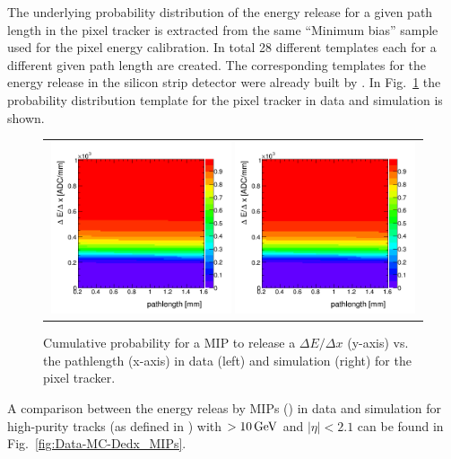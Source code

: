 The underlying probability distribution of the energy release for a given path length in the pixel tracker is extracted from the same ``Minimum bias'' sample used for the pixel energy calibration.
In total 28 different templates each for a different given path length are created.
The corresponding templates for the energy release in the silicon strip detector were already built by  \cite{bib:Quertenmont_2010}.
In Fig.~\ref{fig:ProbabilityTemplate} the probability distribution template for the pixel tracker in data and simulation is shown.
\begin{figure}[!tb]
  \centering 
  \begin{tabular}{c}
    \includegraphics[width=0.49\textwidth]{figures/analysis/Discriminator_template_data_pixel_2012.png}
    \includegraphics[width=0.49\textwidth]{figures/analysis/Discriminator_template_mc_pixel_2012.png}
  \end{tabular}
  \caption{Cumulative probability for a MIP to release a $\Delta E/ \Delta x$ (y-axis) vs. the pathlength (x-axis) in data (left) and simulation (right) for the pixel tracker.}
  \label{fig:ProbabilityTemplate}
\end{figure}
A comparison between the energy releas by MIPs (\ias) in data and simulation for high-purity tracks (as defined in \cite{bib:CMS:Tracking_2010}) with \pt$>10\,\text{Ge}\kern-0.06667em\text{V}$ and $|\eta|<2.1$ can be found in Fig.~\ref{fig:Data-MC-Dedx_MIPs}.
